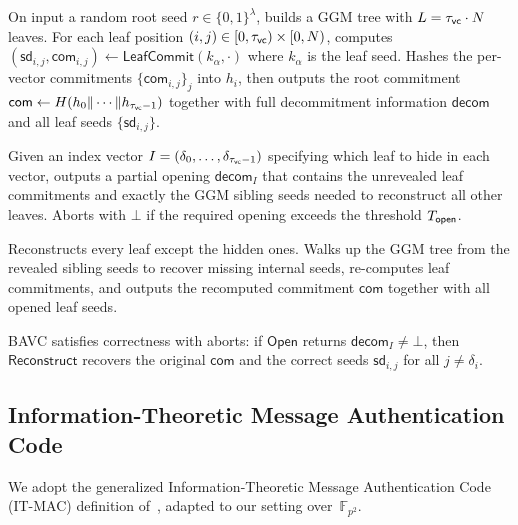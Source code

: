 \documentclass[11pt,a4paper]{article}
\theoremstyle{definition}
\theoremstyle{remark}
\newcommand{\F}{\mathbb{F}}
\begin{document}
\begin{description}[leftmargin=0.9em, labelsep=0.5em]
	\item[$\mathsf{BAVC.Commit}(r) \to (\mathsf{com}, \mathsf{decom}, \{\mathsf{sd}_{i,j}\})$:]
		On input a random root seed $r \in \{0,1\}^\lambda$, builds a GGM tree with $L = \tau_{\sf vc} \cdot N$ leaves.
		For each leaf position $(i,j) \in [0,\tau_{\sf vc}) \times [0,N)$, computes
		$(\mathsf{sd}_{i,j}, \mathsf{com}_{i,j}) \gets \mathsf{LeafCommit}(k_\alpha, \cdot)$
		where $k_\alpha$ is the leaf seed.
		Hashes the per-vector commitments $\{\mathsf{com}_{i,j}\}_j$ into
		$h_i$, then outputs the root commitment $\mathsf{com} \gets H(h_0 \| \cdots \| h_{\tau_{\sf vc}-1})$
		together with full decommitment information $\mathsf{decom}$ and all
		leaf seeds $\{\mathsf{sd}_{i,j}\}$.

	\item[$\mathsf{BAVC.Open}(\mathsf{decom}, I) \to \mathsf{decom}_I$ or $\bot$:]
		Given an index vector $I = (\delta_0, \dots, \delta_{\tau_{\sf vc}-1})$ specifying
		which leaf to hide in each vector, outputs a partial opening $\mathsf{decom}_I$
		that contains the unrevealed leaf commitments and exactly the GGM sibling
		seeds needed to reconstruct all other leaves.
		Aborts with $\bot$ if the required opening exceeds the threshold $T_{\sf open}$.

	\item[$\mathsf{BAVC.Reconstruct}(\mathsf{decom}_I, I) \to (\mathsf{com}, \{\mathsf{sd}_{i,j}\}_{j \neq \delta_i})$:]
		Reconstructs every leaf except the hidden ones.
		Walks up the GGM tree from the revealed sibling seeds to recover missing
		internal seeds, re-computes leaf commitments, and outputs the recomputed
		commitment $\mathsf{com}$ together with all opened leaf seeds.
\end{description}

BAVC satisfies correctness with aborts:
if $\mathsf{Open}$ returns $\mathsf{decom}_I \neq \bot$, then
$\mathsf{Reconstruct}$ recovers the original $\mathsf{com}$ and the correct
seeds $\mathsf{sd}_{i,j}$ for all $j \neq \delta_i$.

\subsection{Information-Theoretic Message Authentication Code}

We adopt the generalized Information-Theoretic Message Authentication Code
(IT-MAC) definition of~\cite{EC:ABBS25}, adapted to our setting over~$\F_{p^2}$.
\end{document}
